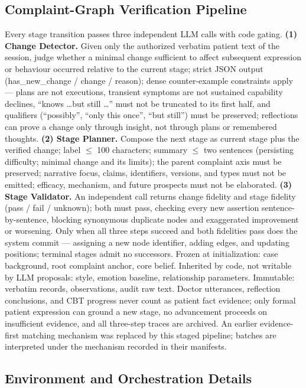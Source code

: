 \documentclass[10pt]{article}
\begin{document}
\subsection{Complaint-Graph Verification Pipeline}

Every stage transition passes three independent LLM calls with code gating.
\textbf{(1) Change Detector.} Given only the authorized verbatim patient text of the session, judge whether a minimal change sufficient to affect subsequent expression or behaviour occurred relative to the current stage; strict JSON output (has\_new\_change / change / reason); dense counter-example constraints apply --- plans are not executions, transient symptoms are not sustained capability declines, ``knows \ldots but still \ldots'' must not be truncated to its first half, and qualifiers (``possibly'', ``only this once'', ``but still'') must be preserved; reflections can prove a change only through insight, not through plans or remembered thoughts.
\textbf{(2) Stage Planner.} Compose the next stage as current stage plus the verified change; label $\le$ 100 characters; summary $\le$ two sentences (persisting difficulty; minimal change and its limits); the parent complaint axis must be preserved; narrative focus, claims, identifiers, versions, and types must not be emitted; efficacy, mechanism, and future prospects must not be elaborated.
\textbf{(3) Stage Validator.} An independent call returns change fidelity and stage fidelity (pass / fail / unknown); both must pass, checking every new assertion sentence-by-sentence, blocking synonymous duplicate nodes and exaggerated improvement or worsening.
Only when all three steps succeed and both fidelities pass does the system commit --- assigning a new node identifier, adding edges, and updating positions; terminal stages admit no successors.
Frozen at initialization: case background, root complaint anchor, core belief.
Inherited by code, not writable by LLM proposals: style, emotion baseline, relationship parameters.
Immutable: verbatim records, observations, audit raw text.
Doctor utterances, reflection conclusions, and CBT progress never count as patient fact evidence; only formal patient expression can ground a new stage, no advancement proceeds on insufficient evidence, and all three-step traces are archived.
An earlier evidence-first matching mechanism was replaced by this staged pipeline; batches are interpreted under the mechanism recorded in their manifests.

\subsection{Environment and Orchestration Details}
\end{document}
